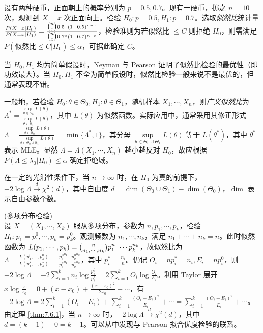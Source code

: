 \documentclass[../main.tex]{subfiles}
\begin{document}
\begin{example}
    设有两种硬币，正面朝上的概率分别为 $p=0.5,0.7$。现有一硬币，掷之 $n=10$ 次，观测到 $X=x$ 次正面向上。检验 $H_0:p=0.5,H_1:p=0.7$。选取\emph{似然比}统计量 $\frac{P(X=x|H_0)}{P(X=x|H_1)}=\frac{\tbinom nx0.5^x(1-0.5)^{n-x}}{\tbinom nx0.7^x(1-0.7)^{n-x}}$，检验准则为若似然比 $\leq C$ 则拒绝 $H_0$，则需满足 $P(\text{似然比}\leq C|H_0)\leq\alpha$，可据此确定 $C$。
\end{example}

当 $H_0,H_1$ 均为简单假设时，Neyman 与 Pearson 证明了似然比检验的最优性（即功效最大）。当 $H_0,H_1$ 不全为简单假设时，似然比检验一般来说不是最优的，但通常表现不错。

一般地，若检验 $H_0:\theta\in\Theta_0,H_1:\theta\in\Theta_1$，随机样本 $X_1,\cdots,X_n$，则\emph{广义似然比}为 $\Lambda^*=\frac{\sup\limits_{\theta\in\Theta_0}L(\theta)}{\sup\limits_{\theta\in\Theta_1}L(\theta)}$，其中 $L(\theta)$ 为似然函数。实际应用中，通常采用其修正形式 $\Lambda=\frac{\sup\limits_{\theta\in\Theta_0}L(\theta)}{\sup\limits_{\theta\in\Theta_0\cup\Theta_1}L(\theta)}=\min\{\Lambda^*,1\}$，其分母 $\sup\limits_{\theta\in\Theta_0\cup\Theta_1}L(\theta)$ 等于 $L(\theta^*)$，其中 $\theta^*$ 表示 MLE。显然 $\Lambda=\Lambda(X_1,\cdots,X_n)$ 越小越反对 $H_0$，故应根据 $P(\Lambda\leq\lambda_0|H_0)\leq\alpha$ 确定拒绝域。

\begin{theorem}\label{thm:7.6.1}
    在一定的光滑性条件下，当 $n\rightarrow\infty$ 时，在 $H_0$ 为真的前提下，$-2\log\Lambda\overset{d}\rightarrow\chi^2(d)$，其中自由度 $d=\dim(\Theta_0\cup\Theta_1)-\dim(\Theta_0)$，$\dim$ 表示自由参数个数。
\end{theorem}

\begin{example}
    (多项分布检验)\\
    设 $X=(X_1,\cdots,X_k)$ 服从多项分布，参数为 $n,p_1,\cdots,p_k$，检验 $H_0:p_1=p_1^0,\cdots,p_k=p_k^0$。观测频数为 $n_1,\cdots,n_k$，满足 $n_1+\cdots+n_k=n$。此时似然函数为 $L(p_1,\cdots,p_k)=\tbinom{n}{n_1,\cdots,n_k}p_1^{n_1}\cdots p_k^{n_k}$，故似然比为 $\Lambda=\frac{L(p_1^0,\cdots,p_k^0)}{L(p_1^*,\cdots,p_k^*)}=\frac{{p_1^0}^{n_1}\cdots {p_k^0}^{n_k}}{{p_1^*}^{n_1}\cdots {p_k^*}^{n_k}}$，其中 $p_i^*=\frac{n_i}n$。仍记 $O_i=np_i^*=n_i,E_i=np_i^0$，则 $-2\log\Lambda=-2\sum_{i=1}^kn_i\log\frac{p_i^0}{p_i^*}=2\sum_{i=1}^kO_i\log\frac{O_i}{E_i}$。利用 Taylor 展开 $x\log\frac x{x_0}=0+(x-x_0)+\frac{(x-x_0)^2}{2x_0}+\cdots$，有 $-2\log\Lambda=2\sum_{i=1}^k(O_i-E_i)+\sum_{i=1}^k\frac{(O_i-E_i)^2}{E_i}+\cdots=\sum_{i=1}^k\frac{(O_i-E_i)^2}{E_i}+\cdots$。由定理 \ref{thm:7.6.1}，当 $n\rightarrow\infty$ 时，$-2\log\Lambda\overset{d}\rightarrow\chi^2(d)$，其中 $d=(k-1)-0=k-1$。可以从中发现与 Pearson 拟合优度检验的联系。
\end{example}
\end{document}
